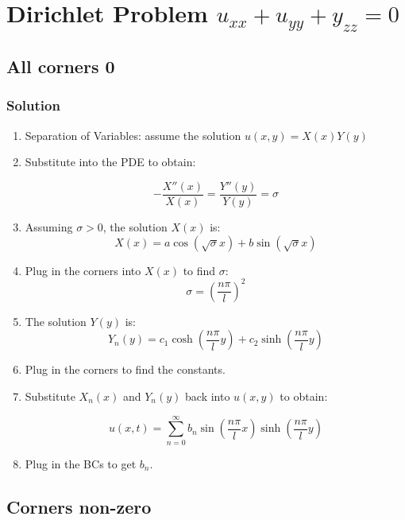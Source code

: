 \documentclass[11pt]{article}
\begin{document}
\section{Dirichlet Problem $u_{xx}+u_{yy}+y_{zz}=0$}

\subsection{All corners 0}
\subsubsection*{Solution}
\begin{enumerate}

\item Separation of Variables: assume the solution $u(x,y) = X(x)Y(y)$
\item Substitute into the PDE to obtain:

$$ -\frac{X''(x)}{X(x)} = \frac{Y''(y)}{Y(y)} = \sigma $$

\item Assuming $\sigma > 0$,  the solution $X(x)$ is:
$$ X(x) = a\cos(\sqrt{\sigma}x) + b\sin(\sqrt{\sigma}x) $$

\item Plug in the corners into $X(x)$ to find $\sigma$:
$$ \sigma = (\frac{n\pi}{l})^2 $$

\item The solution $Y(y)$ is:
$$ Y_n(y) = c_1\cosh(\frac{n\pi}{l}y) + c_2\sinh(\frac{n\pi}{l}y) $$

\item Plug in the corners to find the constants.

\item Substitute $X_n(x)$ and $Y_n(y)$ back into $u(x,y)$ to obtain:

$$ u(x,t) = \sum \limits_{n=0}^{\infty} b_n\sin(\frac{n\pi}{l}x) \sinh(\frac{n\pi}{l}y) $$

\item Plug in the BCs to get $b_n$.
\end{enumerate}

\subsection{Corners non-zero}
\end{document}
